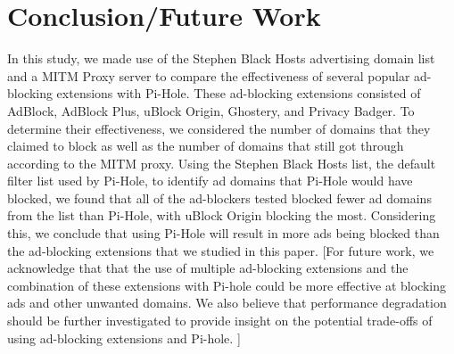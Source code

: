 \documentclass[sigsmall]{acmart}
\begin{document}
\section*{Conclusion/Future Work}
In this study, we made use of the Stephen Black Hosts advertising domain list and a MITM Proxy server to compare the effectiveness of several popular ad-blocking extensions with Pi-Hole. These ad-blocking extensions consisted of AdBlock, AdBlock Plus, uBlock Origin, Ghostery, and Privacy Badger. To determine their effectiveness, we considered the number of domains that they claimed to block as well as the number of domains that still got through according to the MITM proxy. Using the Stephen Black Hosts list, the default filter list used by Pi-Hole, to identify ad domains that Pi-Hole would have blocked, we found that all of the ad-blockers tested blocked fewer ad domains from the list than Pi-Hole, with uBlock Origin blocking the most. Considering this, we conclude that using Pi-Hole will result in more ads being blocked than the ad-blocking extensions that we studied in this paper.
[For future work, we acknowledge that that the use of multiple ad-blocking extensions and the combination of these extensions with Pi-hole could be more effective at blocking ads and other unwanted domains. We also believe that performance degradation should be further investigated to provide insight on the potential trade-offs of using ad-blocking extensions and Pi-hole. 
]


\end{document}
